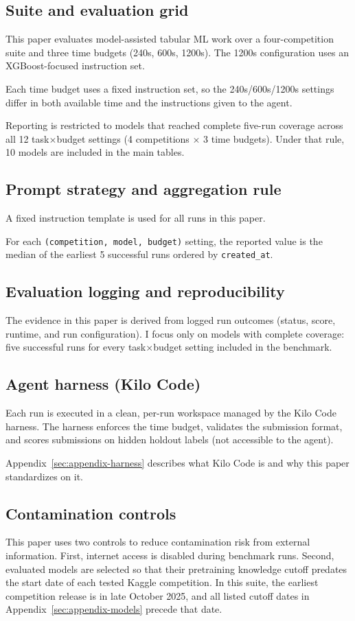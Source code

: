 \subsection{Suite and evaluation grid}
This paper evaluates model-assisted tabular ML work over a four-competition suite and three time budgets (240s, 600s, 1200s). The 1200s configuration uses an XGBoost-focused instruction set.

Each time budget uses a fixed instruction set, so the 240s/600s/1200s settings differ in both available time and the instructions given to the agent.

Reporting is restricted to models that reached complete five-run coverage across all 12 task$\times$budget settings (4 competitions $\times$ 3 time budgets). Under that rule, 10 models are included in the main tables.

\subsection{Prompt strategy and aggregation rule}
A fixed instruction template is used for all runs in this paper.

For each \texttt{(competition, model, budget)} setting, the reported value is the median of the earliest 5 successful runs ordered by \texttt{created\_at}.

\subsection{Evaluation logging and reproducibility}
The evidence in this paper is derived from logged run outcomes (status, score, runtime, and run configuration). I focus only on models with complete coverage: five successful runs for every task$\times$budget setting included in the benchmark.

\subsection{Agent harness (Kilo Code)}
Each run is executed in a clean, per-run workspace managed by the Kilo Code harness. The harness enforces the time budget, validates the submission format, and scores submissions on hidden holdout labels (not accessible to the agent).

Appendix~\ref{sec:appendix-harness} describes what Kilo Code is and why this paper standardizes on it.

\subsection{Contamination controls}
This paper uses two controls to reduce contamination risk from external information. First, internet access is disabled during benchmark runs. Second, evaluated models are selected so that their pretraining knowledge cutoff predates the start date of each tested Kaggle competition. In this suite, the earliest competition release is in late October 2025, and all listed cutoff dates in Appendix~\ref{sec:appendix-models} precede that date.

